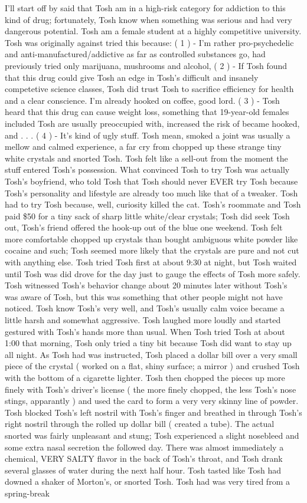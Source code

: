 \documentclass[12pt]{book}
\begin{document}
I'll start off by said that Tosh am in a high-risk category for addiction to this kind of drug; fortunately, Tosh know when something was serious and had very dangerous potential. Tosh am a female student at a highly competitive university. Tosh was originally against tried this because: ( 1 ) - I'm rather pro-psychedelic and anti-manufactured/addictive as far as controlled substances go, had previously tried only marijuana, mushrooms and alcohol, ( 2 ) - If Tosh found that this drug could give Tosh an edge in Tosh's difficult and insanely competetive science classes, Tosh did trust Tosh to sacrifice efficiency for health and a clear conscience. I'm already hooked on coffee, good lord. ( 3 ) - Tosh heard that this drug can cause weight loss, something that 19-year-old females included Tosh are usually preoccupied with, increased the risk of became hooked, and  . . .  ( 4 ) - It's kind of ugly stuff. Tosh mean, smoked a joint was usually a mellow and calmed experience, a far cry from chopped up these strange tiny white crystals and snorted Tosh. Tosh felt like a sell-out from the moment the stuff entered Tosh's possession. What convinced Tosh to try Tosh was actually Tosh's boyfriend, who told Tosh that Tosh should never EVER try Tosh because Tosh's personality and lifestyle are already too much like that of a tweaker. Tosh had to try Tosh because, well, curiosity killed the cat. Tosh's roommate and Tosh paid \$50 for a tiny sack of sharp little white/clear crystals; Tosh did seek Tosh out, Tosh's friend offered the hook-up out of the blue one weekend. Tosh felt more comfortable chopped up crystals than bought ambiguous white powder like cocaine and such; Tosh seemed more likely that the crystals are pure and not cut with anything else. Tosh tried Tosh first at about 9:30 at night, but Tosh waited until Tosh was did drove for the day just to gauge the effects of Tosh more safely. Tosh witnessed Tosh's behavior change about 20 minutes later without Tosh's was aware of Tosh, but this was something that other people might not have noticed. Tosh know Tosh's very well, and Tosh's usually calm voice became a little harsh and somewhat aggressive. Tosh laughed more loudly and started gestured with Tosh's hands more than usual. When Tosh tried Tosh at about 1:00 that morning, Tosh only tried a tiny bit because Tosh did want to stay up all night. As Tosh had was instructed, Tosh placed a dollar bill over a very small piece of the crystal ( worked on a flat, shiny surface; a mirror ) and crushed Tosh with the bottom of a cigarette lighter. Tosh then chopped the pieces up more finely with Tosh's driver's license ( the more finely chopped, the less Tosh's nose stings, apparantly ) and used the card to form a very very skinny line of powder. Tosh blocked Tosh's left nostril with Tosh's finger and breathed in through Tosh's right nostril through the rolled up dollar bill ( created a tube). The actual snorted was fairly unpleasant and stung; Tosh experienced a slight nosebleed and some extra nasal secretion the followed day. There was almost immediately a chemical, VERY SALTY flavor in the back of Tosh's throat, and Tosh drank several glasses of water during the next half hour. Tosh tasted like Tosh had downed a shaker of Morton's, or snorted Tosh. Tosh had was very tired from a spring-break 
\end{document}
